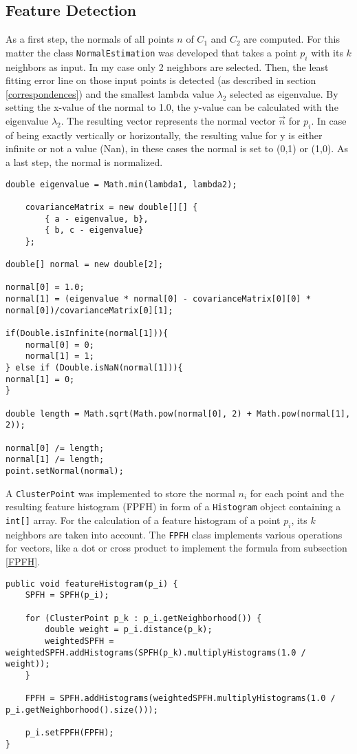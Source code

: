 \subsection{Feature Detection}
As a first step, the normals of all points $n$ of $C_1$ and $C_2$ are computed. For this matter the class \texttt{NormalEstimation} was developed that takes a point $p_i$ with its $k$ neighbors as input. In my case only 2 neighbors are selected. Then, the least fitting error line on those input points is detected (as described in section \ref{correspondences}) and the smallest lambda value $\lambda_2$ selected as eigenvalue. By setting the x-value of the normal to 1.0, the y-value can be calculated with the eigenvalue $\lambda_2$. The resulting vector represents the normal vector $\vec{n}$ for $p_i$. In case of being exactly vertically or horizontally, the resulting value for y is either infinite or not a value (Nan), in these cases the normal is set to (0,1) or (1,0). As a last step, the normal is normalized.
\begin{lstlisting}
double eigenvalue = Math.min(lambda1, lambda2);

	covarianceMatrix = new double[][] { 
		{ a - eigenvalue, b},
		{ b, c - eigenvalue}
	};

double[] normal = new double[2];

normal[0] = 1.0;
normal[1] = (eigenvalue * normal[0] - covarianceMatrix[0][0] * normal[0])/covarianceMatrix[0][1];

if(Double.isInfinite(normal[1])){
	normal[0] = 0;
	normal[1] = 1;
} else if (Double.isNaN(normal[1])){
normal[1] = 0;
}

double length = Math.sqrt(Math.pow(normal[0], 2) + Math.pow(normal[1], 2));
		
normal[0] /= length;
normal[1] /= length;
point.setNormal(normal);
\end{lstlisting}
A \texttt{ClusterPoint} was implemented to store the normal $n_i$ for each point and the resulting feature histogram (FPFH) in form of a \texttt{Histogram} object containing a \texttt{int[]} array. For the calculation of a feature histogram of a point $p_i$, its $k$ neighbors are taken into account. The \texttt{FPFH} class implements various operations for vectors, like a dot or cross product to implement the formula from subsection \ref{FPFH}.
\begin{lstlisting}
public void featureHistogram(p_i) {
	SPFH = SPFH(p_i);

	for (ClusterPoint p_k : p_i.getNeighborhood()) {
		double weight = p_i.distance(p_k);
		weightedSPFH = weightedSPFH.addHistograms(SPFH(p_k).multiplyHistograms(1.0 / weight));
	}
	
	FPFH = SPFH.addHistograms(weightedSPFH.multiplyHistograms(1.0 / p_i.getNeighborhood().size()));
	
	p_i.setFPFH(FPFH);
}
\end{lstlisting}
